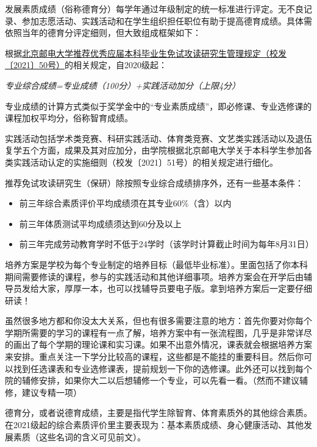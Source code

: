 发展素质成绩（俗称德育分）每学年通过年级制定的统一标准进行评定。无不良记录、参加志愿活动、实践活动和在学生组织担任职位有助于提高德育成绩。具体需依照当年的德育分评定细则，但大致组成框架如下：


根据\href{http://my.bupt.edu.cn/content.jsp?urltype=news.NewsContentUrl&wbtreeid=1036&wbnewsid=95475}{北京邮电大学推荐优秀应届本科毕业生免试攻读研究生管理规定（校发〔2021〕50号）}的相关规定，自2020级起：
\begin{center}
    \emph{专业综合成绩=专业成绩（100分）+实践活动加分（上限4分）}
\end{center}

专业成绩的计算方式类似于奖学金中的“专业素质成绩”，即必修课、专业选修课的课程加权平均分，俗称智育成绩。

实践活动包括学术类竞赛、科研实践活动、体育类竞赛、文艺类实践活动以及退伍复学五个方面，成果及其对应加分，由学院根据北京邮电大学关于本科学生参加各类实践活动认定的实施细则（校发〔2021〕51号）的相关规定进行细化。

推荐免试攻读研究生（保研）除按照专业综合成绩排序外，还有一些基本条件：
\begin{itemize}
    \kaishu
    \item 前三年综合素质评价平均成绩须在其专业60\%（含）以内
    \item 前三年体质测试平均成绩须达到60分及以上
    \item 前三年完成劳动教育学时不低于24学时（该学时计算截止时间为每年8月31日）
\end{itemize}


培养方案是学校为每个专业制定的培养目标（最低毕业标准）。里面包括了你本科期间需要修读的课程，参与的实践活动和其他详细事项。培养方案会在开学后由辅导员发给大家，厚厚一本，也可以找辅导员要电子版。拿到培养方案后一定要仔细研读！

虽然很多地方都和你没太大关系，但也有很多需要注意的地方：首先你要对你每个学期所需要的学习的课程有一点了解，培养方案中有一张流程图，几乎是非常详尽的画出了每个学期的理论课和实习课。如果不出意外情况，课表就会根据培养方案来安排。重点关注一下学分比较高的课程，这些都是不能挂的重要科目。然后你可以找到任选课表和专业选修课表，提前规划一下你的选修课。此外还可以找到每个院的辅修安排，如果你大二以后想辅修一个专业，可以先看一看。（然而不建议辅修，建议专精一项）


德育分，或者说德育成绩，主要是指代学生除智育、体育素质外的其他综合素质。在2021级起的综合素质评价里主要表现为：基本素质成绩、身心健康活动、其他发展素质（这些名词的含义可见前文）。

